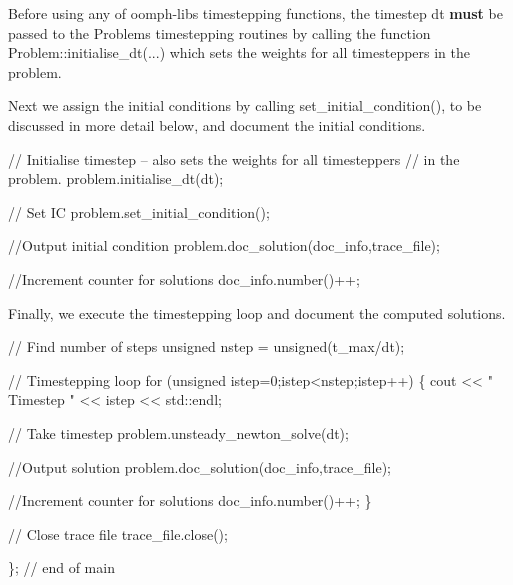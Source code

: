 Before using any of {\ttfamily oomph-\/lib\textquotesingle{}s} timestepping functions, the timestep {\ttfamily dt} {\bfseries must} be passed to the {\ttfamily Problem\textquotesingle{}s} timestepping routines by calling the function {\ttfamily Problem\+::initialise\+\_\+dt}(...) which sets the weights for all timesteppers in the problem.

Next we assign the initial conditions by calling {\ttfamily set\+\_\+initial\+\_\+condition()}, to be discussed in more detail below, and document the initial conditions.


\begin{DoxyCodeInclude}
 \textcolor{comment}{// Initialise timestep -- also sets the weights for all timesteppers}
 \textcolor{comment}{// in the problem.}
 problem.initialise\_dt(dt);
 
 \textcolor{comment}{// Set IC}
 problem.set\_initial\_condition();
 
 \textcolor{comment}{//Output initial condition}
 problem.doc\_solution(doc\_info,trace\_file);
 
 \textcolor{comment}{//Increment counter for solutions }
 doc\_info.number()++;

\end{DoxyCodeInclude}


Finally, we execute the timestepping loop and document the computed solutions.


\begin{DoxyCodeInclude}
 \textcolor{comment}{// Find number of steps}
 \textcolor{keywordtype}{unsigned} nstep = unsigned(t\_max/dt);

 \textcolor{comment}{// Timestepping loop}
 \textcolor{keywordflow}{for} (\textcolor{keywordtype}{unsigned} istep=0;istep<nstep;istep++)
  \{
   cout << \textcolor{stringliteral}{" Timestep "} << istep << std::endl;
   
   \textcolor{comment}{// Take timestep}
   problem.unsteady\_newton\_solve(dt);
   
   \textcolor{comment}{//Output solution}
   problem.doc\_solution(doc\_info,trace\_file);
   
   \textcolor{comment}{//Increment counter for solutions }
   doc\_info.number()++;
  \}
 
 \textcolor{comment}{// Close trace file}
 trace\_file.close();


\}; \textcolor{comment}{// end of main}

\end{DoxyCodeInclude}


